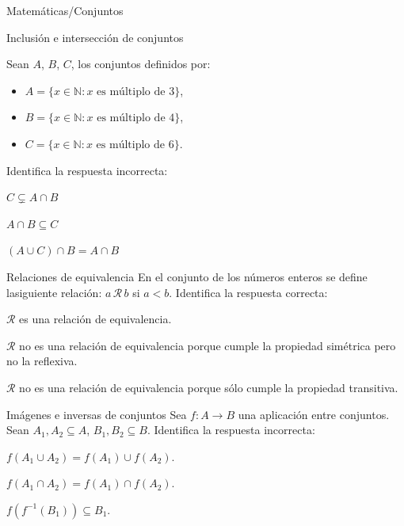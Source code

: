 \documentclass[12pt]{article}
\begin{document}
\begin{quiz}{Matemáticas/Conjuntos}
 


\begin{multi}[shuffle=true,numbering=none, feedback={	
Si calculamos $A\cap B$, obtenemos el conjunto de los números naturales que son múltiplos de 12, y que por tanto está incluido en $C$. Por lo tanto, $A\cap B\subseteq C$ es la opción correcta.
}]{Inclusión e intersección de conjuntos}

Sean $A$, $B$, $C$, los conjuntos definidos por:
\begin{itemize}
    \item $A=\{x\in\mathbb{N}\colon x \text{ es múltiplo de } 3\}$,
    \item $B=\{x\in\mathbb{N}\colon x \text{ es múltiplo de } 4\}$,
    \item $C=\{x\in\mathbb{N}\colon x \text{ es múltiplo de } 6\}$.
\end{itemize}

Identifica la respuesta incorrecta: 
\item  $C\subsetneq A\cap B$
\item* $A\cap B\subseteq C$
\item  $(A\cup C)\cap B=A\cap B$
\end{multi}


\begin{multi}[shuffle=true,numbering=none, feedback={La relación menor estricto en los números reales es transitiva, peno no es reflexiva ni simétrica, por lo que no es una relación de equivalencia.
}]{Relaciones de equivalencia}
En el conjunto de los números enteros se define lasiguiente relación: $a\,\mathcal{R}\, b$ si $a< b$. Identifica la respuesta correcta: 
\item $\mathcal{R}$ es una relación de equivalencia.
\item $\mathcal{R}$ no es una relación de equivalencia porque cumple la propiedad simétrica pero no la reflexiva.
\item* $\mathcal{R}$ no es una relación de equivalencia porque sólo cumple la propiedad transitiva.

\end{multi}


\begin{multi}[shuffle=true,numbering=none, feedback={Puede darse que $A_1$ y $A_2$ sean disjuntos, pero $f(A_1)\cap f(A_2)$ puede no ser vacío.}]{Imágenes e inversas de conjuntos}
Sea $f\colon A\to B$ una aplicación entre conjuntos. Sean $A_1, A_2\subseteq A$, $B_1, B_2\subseteq B$. Identifica la respuesta incorrecta: 
\item  $f(A_1\cup A_2)=f(A_1) \cup f(A_2)$.
\item* $f(A_1\cap A_2)=f(A_1) \cap f(A_2)$. 
\item  $f(f^{-1}(B_1))\subseteq B_1$.
\end{multi}


\end{quiz}
\end{document}
